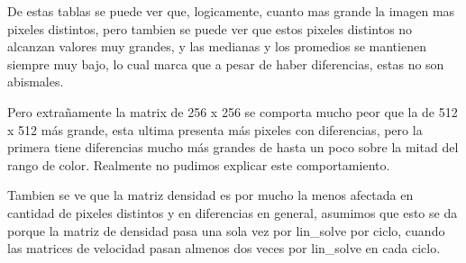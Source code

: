 De estas tablas se puede ver que, logicamente, cuanto mas grande la imagen mas pixeles distintos,
pero tambien se puede ver que estos pixeles distintos no alcanzan valores muy grandes, y las medianas
y los promedios se mantienen siempre muy bajo, lo cual marca que a pesar de haber diferencias, estas no son
abismales.


Pero extrañamente la matrix de 256 x 256 se comporta mucho peor que la de 512 x 512 más grande, esta ultima
presenta más pixeles con diferencias, pero la primera tiene diferencias mucho más grandes de hasta un poco sobre la mitad
del rango de color. Realmente no pudimos explicar este comportamiento.


Tambien se ve que la matriz densidad es por mucho la menos afectada en cantidad de pixeles distintos y en
diferencias en general, asumimos que esto se da porque la matriz de densidad pasa una sola vez por lin_solve por ciclo,
cuando las matrices de velocidad pasan almenos dos veces por lin_solve en cada ciclo.
